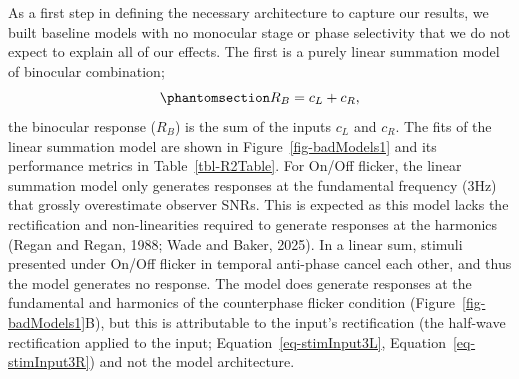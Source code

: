 \documentclass[
  12pt,
]{article}
\begin{document}
As a first step in defining the necessary architecture to capture our
results, we built baseline models with no monocular stage or phase
selectivity that we do not expect to explain all of our effects. The
first is a purely linear summation model of binocular combination;
\begin{equation}\phantomsection\label{eq-linearSumModel}{
R_B = c_L+c_R,
}\end{equation} the binocular response (\(R_B\)) is the sum of the
inputs \(c_L\) and \(c_R\). The fits of the linear summation model are
shown in Figure~\ref{fig-badModels1} and its performance metrics in
Table~\ref{tbl-R2Table}. For On/Off flicker, the linear summation model
only generates responses at the fundamental frequency (3Hz) that grossly
overestimate observer SNRs. This is expected as this model lacks the
rectification and non-linearities required to generate responses at the
harmonics (Regan and Regan, 1988; Wade and Baker, 2025). In a linear
sum, stimuli presented under On/Off flicker in temporal anti-phase
cancel each other, and thus the model generates no response. The model
does generate responses at the fundamental and harmonics of the
counterphase flicker condition (Figure~\ref{fig-badModels1}B), but this
is attributable to the input's rectification (the half-wave
rectification applied to the input;
Equation~\ref{eq-stimInput3L}, Equation~\ref{eq-stimInput3R}) and not
the model architecture.
\end{document}
